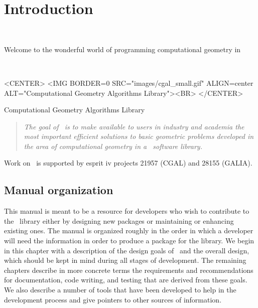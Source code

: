 
\chapter{Introduction}
\label{chap:intro}
 \\

Welcome to the wonderful world of programming computational geometry in 
\begin{ccTexOnly}
\begin{center}
{}\\
\end{center}
\end{ccTexOnly}

\begin{ccHtmlOnly}
<CENTER>
<IMG BORDER=0 SRC="images/cgal_small.gif" ALIGN=center ALT="Computational Geometry Algorithms Library"><BR>
</CENTER>
\end{ccHtmlOnly}
\centerline{{\sc Computational Geometry Algorithms Library}}


\begin{quote}
{\em The goal of \cgal\ is to make available to users in industry and academia
the most important efficient solutions to basic geometric problems
developed in the area of computational geometry in a \CC\ software library.}
\end{quote}

Work on \cgal\ is supported by {\sc esprit iv} projects 21957 (CGAL) and
28155 (GALIA).

\section{Manual organization}
\label{sec:manual_org}

This manual is meant to be a resource for developers who wish to contribute
to the \cgal\ library either by designing new packages or maintaining
or enhancing existing ones. The manual is organized roughly in the order in
which a developer will need the information in order to produce a package
for the library. We begin in this chapter with a description 
of the design goals of \cgal\ and the overall design, which should be kept 
in mind during all stages of development.  The remaining chapters describe 
in more concrete terms the requirements and recommendations for documentation, 
code writing, and testing that are derived from these goals.  We also describe 
a number of tools that have been developed to help in the development process 
and give pointers to other sources of information.

